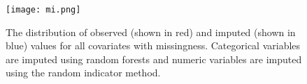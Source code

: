 \documentclass[11pt]{article}
\begin{document}
\begin{figure}[!htpb]
\centering
\texttt{[image: mi.png]}
\caption{The distribution of observed (shown in red) and imputed (shown in blue) values for all covariates with missingness. Categorical variables are imputed using random forests and numeric variables are imputed using the random indicator method.}
\label{fig:mi}
\end{figure}

\clearpage



\end{document}
